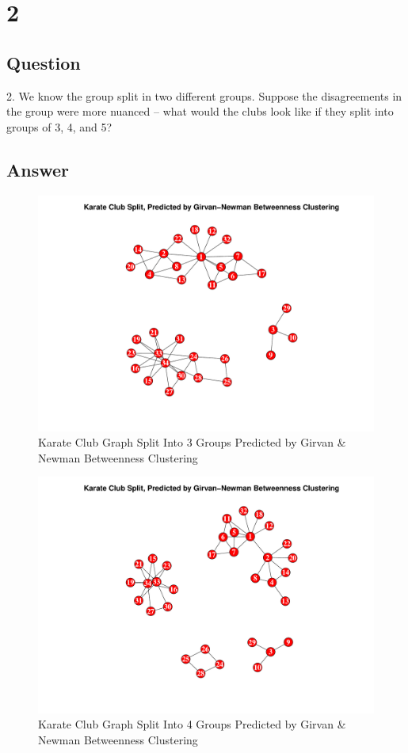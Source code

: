 \documentclass[letterpaper,11pt]{article}
\begin{document}
\newpage


\section*{2}

\subsection*{Question}

2.  We know the group split in two different groups.  Suppose the
disagreements in the group were more nuanced -- what would the clubs
look like if they split into groups of 3, 4, and 5?


\subsection*{Answer}

\begin{figure}[h]
\includegraphics[scale=0.5]{group-of-3.pdf}
\caption{Karate Club Graph Split Into 3 Groups Predicted by Girvan \& Newman Betweenness Clustering}
\label{fig:club-3-split}
\end{figure}

\begin{figure}[h]
\includegraphics[scale=0.5]{group-of-4.pdf}
\caption{Karate Club Graph Split Into 4 Groups Predicted by Girvan \& Newman Betweenness Clustering}
\label{fig:club-4-split}
\end{figure}
\end{document}
